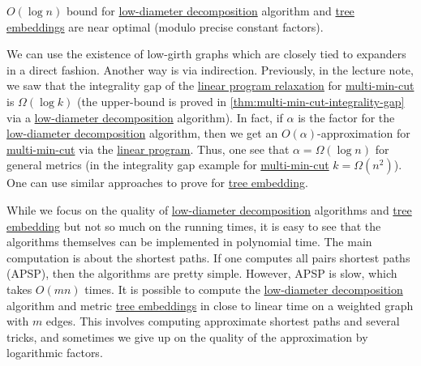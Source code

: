 \begin{remark}
	\(O(\log n)\) bound for \hyperref[def:low-diameter-decomposition]{low-diameter decomposition} algorithm and \hyperref[prb:tree-embedding]{tree embeddings} are near optimal (modulo precise constant factors).
\end{remark}
\begin{explanation}
	We can use the existence of low-girth graphs which are closely tied to expanders in a direct fashion. Another way is via indirection. Previously, in the lecture note, we saw that the integrality gap of the \hyperref[eq:multi-min-cut-LP]{linear program relaxation} for \hyperref[prb:multi-min-cut]{multi-min-cut} is \(\Omega (\log k)\) (the upper-bound is proved in \autoref{thm:multi-min-cut-integrality-gap} via a \hyperref[def:low-diameter-decomposition]{low-diameter decomposition} algorithm). In fact, if \(\alpha \) is the factor for the \hyperref[def:low-diameter-decomposition]{low-diameter decomposition} algorithm, then we get an \(O(\alpha )\)-approximation for \hyperref[prb:multi-min-cut]{multi-min-cut} via the \hyperref[eq:multi-min-cut-LP]{linear program}. Thus, one see that \(\alpha = \Omega (\log n)\) for general metrics (in the integrality gap example for \hyperref[prb:multi-min-cut]{multi-min-cut} \(k = \Omega (n^2)\)). One can use similar approaches to prove for \hyperref[prb:tree-embedding]{tree embedding}.
\end{explanation}

\begin{note}
	While we focus on the quality of \hyperref[def:low-diameter-decomposition]{low-diameter decomposition} algorithms and \hyperref[prb:tree-embedding]{tree embedding} but not so much on the running times, it is easy to see that the algorithms themselves can be implemented in polynomial time. The main computation is about the shortest paths. If one computes all pairs shortest paths (APSP), then the algorithms are pretty simple. However, APSP is slow, which takes \(O(mn)\) times. It is possible to compute the \hyperref[def:low-diameter-decomposition]{low-diameter decomposition} algorithm and metric \hyperref[prb:tree-embedding]{tree embeddings} in close to linear time on a weighted graph with \(m\) edges. This involves computing approximate shortest paths and several tricks, and sometimes we give up on the quality of the approximation by logarithmic factors.
\end{note}